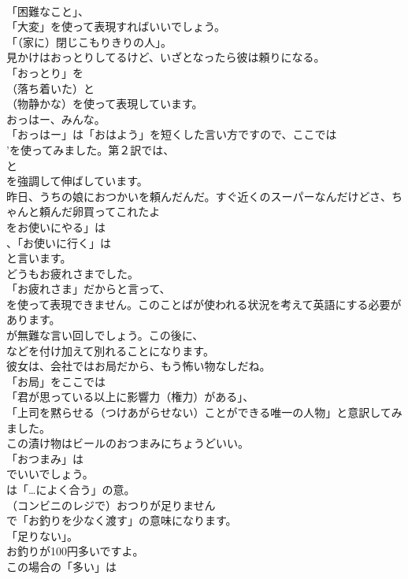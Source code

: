\documentclass[8pt]{extreport}
\begin{document}
\begin{CJK}{UTF8}{min}
\\	「困難なこと」、
\\	「大変」を使って表現すればいいでしょう。
\\	「（家に）閉じこもりきりの人」。	
\\	見かけはおっとりしてるけど、いざとなったら彼は頼りになる。 
\\	「おっとり」を 
\\	（落ち着いた）と
\\	（物静かな）を使って表現しています。	
\\	おっはー、みんな。 
\\	「おっはー」は「おはよう」を短くした言い方ですので、ここでは
\\	'を使ってみました。第２訳では、
\\	と
\\	を強調して伸ばしています。	
\\	昨日、うちの娘におつかいを頼んだんだ。すぐ近くのスーパーなんだけどさ、ちゃんと頼んだ卵買ってこれたよ 
\\	をお使いにやる」は
\\	、「お使いに行く」は
\\	と言います。	
\\	どうもお疲れさまでした。 
\\	「お疲れさま」だからと言って、
\\	を使って表現できません。このことばが使われる状況を考えて英語にする必要があります。
\\	が無難な言い回しでしょう。この後に、
\\	などを付け加えて別れることになります。	
\\	彼女は、会社ではお局だから、もう怖い物なしだね。 
\\	「お局」をここでは
\\	「君が思っている以上に影響力（権力）がある」、
\\	「上司を黙らせる（つけあがらせない）ことができる唯一の人物」と意訳してみました。	
\\	この漬け物はビールのおつまみにちょうどいい。 
\\	「おつまみ」は 
\\	でいいでしょう。
\\	は「…によく合う」の意。	
\\	（コンビニのレジで）おつりが足りません 
\\	で「お釣りを少なく渡す」の意味になります。
\\	「足りない」。	
\\	お釣りが100円多いですよ。 
\\	この場合の「多い」は

\end{CJK}
\end{document}

